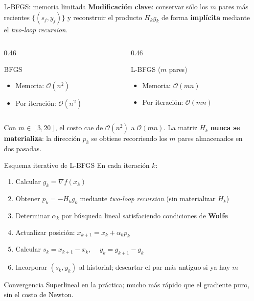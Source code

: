 \documentclass[11pt]{beamer}
\begin{document}
\begin{frame}{L-BFGS: memoria limitada}
\textbf{Modificación clave}: conservar sólo los $m$ pares más recientes $\{(s_j, y_j)\}$ y reconstruir el producto $H_k g_k$ de forma \textbf{implícita} mediante el \textit{two-loop recursion}.

\medskip
\begin{columns}
\begin{column}{0.46\textwidth}
\begin{block}{BFGS}
\begin{itemize}
    \item Memoria: $\mathcal{O}(n^2)$
    \item Por iteración: $\mathcal{O}(n^2)$
\end{itemize}
\end{block}
\end{column}
\begin{column}{0.46\textwidth}
\begin{block}{L-BFGS ($m$ pares)}
\begin{itemize}
    \item Memoria: $\mathcal{O}(mn)$
    \item Por iteración: $\mathcal{O}(mn)$
\end{itemize}
\end{block}
\end{column}
\end{columns}
\medskip

Con $m \in [3, 20]$, el costo cae de $\mathcal{O}(n^2)$ a $\mathcal{O}(mn)$.
La matriz $H_k$ \textbf{nunca se materializa}: la dirección $p_k$ se obtiene recorriendo los $m$ pares almacenados en dos pasadas.
\end{frame}

\begin{frame}{Esquema iterativo de L-BFGS}
En cada iteración $k$:
\begin{enumerate}
    \item Calcular $g_k = \nabla f(x_k)$
    \item Obtener $p_k = -H_k g_k$ mediante \textit{two-loop recursion} (sin materializar $H_k$)
    \item Determinar $\alpha_k$ por búsqueda lineal satisfaciendo condiciones de \textbf{Wolfe}
    \item Actualizar posición: $x_{k+1} = x_k + \alpha_k p_k$
    \item Calcular $s_k = x_{k+1} - x_k$, $\quad y_k = g_{k+1} - g_k$
    \item Incorporar $(s_k, y_k)$ al historial; descartar el par más antiguo si ya hay $m$
\end{enumerate}
\begin{block}{Convergencia}
    Superlineal en la práctica; mucho más rápido que el gradiente puro, sin el costo de Newton.
\end{block}
\end{frame}
\end{document}
